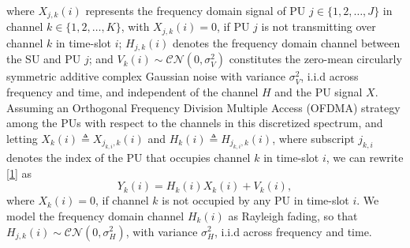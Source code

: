 \documentclass[12pt, draftcls, onecolumn]{IEEEtran}
\begin{document}
where $X_{j,k}(i)$ represents the frequency domain signal of PU $j{\in}\{1,2,\dots,J\}$ in channel $k \in \{1,2,\dots,K\}$, with $X_{j,k}(i){=}0$, if PU $j$ is not transmitting over channel $k$ in time-slot $i$; $H_{j,k}(i)$ denotes the frequency domain channel between the SU and PU $j$; and $V_{k}(i){\sim}\mathcal{CN}(0,\sigma_{V}^{2})$ constitutes the zero-mean circularly symmetric additive complex Gaussian noise with variance $\sigma_{V}^{2}$, i.i.d across frequency and time, and independent of the channel $H$ and the PU signal $X$. Assuming an Orthogonal Frequency Division Multiple Access (OFDMA) strategy among the PUs with respect to the channels in this discretized spectrum, and letting $X_{k}(i){\triangleq}X_{j_{k,i},k}(i)$ and $H_{k}(i){\triangleq}H_{j_{k,i},k}(i)$, where subscript $j_{k,i}$ denotes the index of the PU that occupies channel $k$ in time-slot $i$, we can rewrite \eqref{1} as
\begin{equation}\label{2}
    Y_{k}(i)=H_{k}(i)X_{k}(i)+V_{k}(i),
\end{equation}
where $X_{k}(i){=}0$, if channel $k$ is not occupied by any PU in time-slot $i$. We model the frequency domain channel $H_{k}(i)$ as Rayleigh fading,
so that $H_{j,k}(i) \sim \mathcal{CN}(0,\sigma_{H}^{2})$, with variance $\sigma_{H}^{2}$,
 i.i.d across frequency and time.
\end{document}
